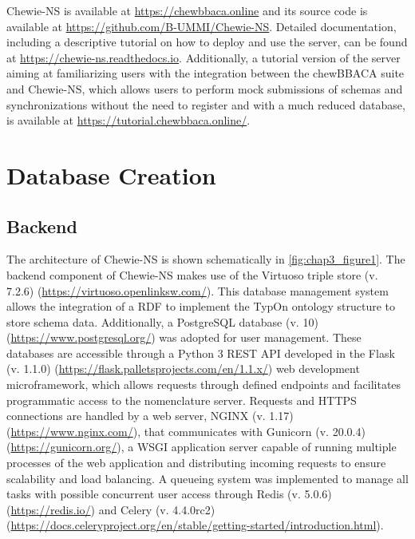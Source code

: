 \ac{Chewie-NS} is available at \url{https://chewbbaca.online} and its source code is available at \url{https://github.com/B-UMMI/Chewie-NS}. Detailed documentation, including a descriptive tutorial on how to deploy and use the server, can be found at \url{https://chewie-ns.readthedocs.io}. Additionally, a tutorial version of the server aiming at familiarizing users with the integration between the chewBBACA suite and \ac{Chewie-NS}, which allows users to perform mock submissions of schemas and synchronizations without the need to register and with a much reduced database, is available at \url{https://tutorial.chewbbaca.online/}.

\section{Database Creation} \label{sec:ch3_database_creation}

\subsection{Backend} \label{ssec:ch3_database_creation_backend}

The architecture of \ac{Chewie-NS} is shown schematically in \ref{fig:chap3_figure1}. The backend component of \ac{Chewie-NS} makes use of the Virtuoso triple store (v. 7.2.6) (\url{https://virtuoso.openlinksw.com/}). This database management system allows the integration of a \ac{RDF} to implement the TypOn ontology \cite{vaz_typon_2014} structure to store schema data. Additionally, a PostgreSQL database (v. 10) (\url{https://www.postgresql.org/}) was adopted for user management. These databases are accessible through a Python 3 \ac{REST} \ac{API} developed in the Flask (v. 1.1.0) (\url{https://flask.palletsprojects.com/en/1.1.x/}) web development microframework, which allows requests through defined endpoints and facilitates programmatic access to the nomenclature server. Requests and \ac{HTTPS} connections are handled by a web server, NGINX (v. 1.17) (\url{https://www.nginx.com/}), that communicates with Gunicorn (v. 20.0.4) (\url{https://gunicorn.org/}), a \ac{WSGI} application server capable of running multiple processes of the web application and distributing incoming requests to ensure scalability and load balancing. A queueing system was implemented to manage all tasks with possible concurrent user access through Redis (v. 5.0.6) (\url{https://redis.io/}) and Celery (v. 4.4.0rc2) (\url{https://docs.celeryproject.org/en/stable/getting-started/introduction.html}).

